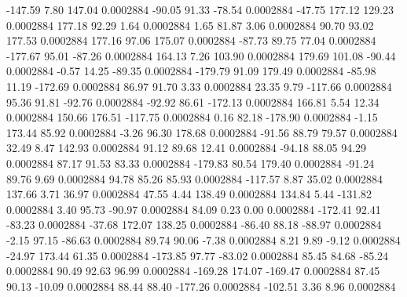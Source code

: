      -147.59        7.80      147.04     0.0002884
      -90.05       91.33      -78.54     0.0002884
      -47.75      177.12      129.23     0.0002884
      177.18       92.29        1.64     0.0002884
        1.65       81.87        3.06     0.0002884
       90.70       93.02      177.53     0.0002884
      177.16       97.06      175.07     0.0002884
      -87.73       89.75       77.04     0.0002884
     -177.67       95.01      -87.26     0.0002884
      164.13        7.26      103.90     0.0002884
      179.69      101.08      -90.44     0.0002884
       -0.57       14.25      -89.35     0.0002884
     -179.79       91.09      179.49     0.0002884
      -85.98       11.19     -172.69     0.0002884
       86.97       91.70        3.33     0.0002884
       23.35        9.79     -117.66     0.0002884
       95.36       91.81      -92.76     0.0002884
      -92.92       86.61     -172.13     0.0002884
      166.81        5.54       12.34     0.0002884
      150.66      176.51     -117.75     0.0002884
        0.16       82.18     -178.90     0.0002884
       -1.15      173.44       85.92     0.0002884
       -3.26       96.30      178.68     0.0002884
      -91.56       88.79       79.57     0.0002884
       32.49        8.47      142.93     0.0002884
       91.12       89.68       12.41     0.0002884
      -94.18       88.05       94.29     0.0002884
       87.17       91.53       83.33     0.0002884
     -179.83       80.54      179.40     0.0002884
      -91.24       89.76        9.69     0.0002884
       94.78       85.26       85.93     0.0002884
     -117.57        8.87       35.02     0.0002884
      137.66        3.71       36.97     0.0002884
       47.55        4.44      138.49     0.0002884
      134.84        5.44     -131.82     0.0002884
        3.40       95.73      -90.97     0.0002884
       84.09        0.23        0.00     0.0002884
     -172.41       92.41      -83.23     0.0002884
      -37.68      172.07      138.25     0.0002884
      -86.40       88.18      -88.97     0.0002884
       -2.15       97.15      -86.63     0.0002884
       89.74       90.06       -7.38     0.0002884
        8.21        9.89       -9.12     0.0002884
      -24.97      173.44       61.35     0.0002884
     -173.85       97.77      -83.02     0.0002884
       85.45       84.68      -85.24     0.0002884
       90.49       92.63       96.99     0.0002884
     -169.28      174.07     -169.47     0.0002884
       87.45       90.13      -10.09     0.0002884
       88.44       88.40     -177.26     0.0002884
     -102.51        3.36        8.96     0.0002884
